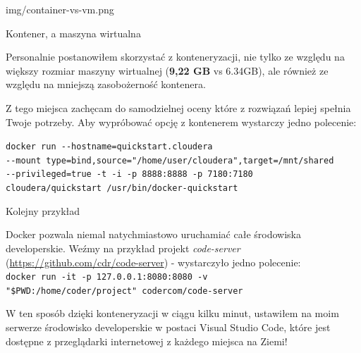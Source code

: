 \documentclass[aspectratio=169]{beamer}
\begin{document}
\begin{frameImg}[1080]{img/container-vs-vm.png}
    \vspace*{-40mm}
    \begin{cardTiny}
        Kontener, a maszyna wirtualna
    \end{cardTiny}
\end{frameImg}

\begin{frame}
    \begin{cardTiny}
        Personalnie postanowiłem skorzystać z konteneryzacji, nie tylko ze względu na większy rozmiar maszyny wirtualnej (\textbf{9,22 GB} vs 6.34GB),
        ale również ze względu na mniejszą zasobożerność kontenera.
    \end{cardTiny}
    \begin{cardTiny}
        Z tego miejsca zachęcam do samodzielnej oceny które z rozwiązań lepiej spełnia Twoje potrzeby.
        Aby wypróbować opcję z kontenerem wystarczy jedno polecenie:
    \end{cardTiny}
    \begin{cardTiny}
        \colorbox{dark-gray}{\lstinline{docker run --hostname=quickstart.cloudera}}\\
        \colorbox{dark-gray}{\lstinline{--mount type=bind,source="/home/user/cloudera",target=/mnt/shared}}\\
        \colorbox{dark-gray}{\lstinline{--privileged=true -t -i -p 8888:8888 -p 7180:7180}}\\
        \colorbox{dark-gray}{\lstinline{cloudera/quickstart /usr/bin/docker-quickstart}}
    \end{cardTiny}
\end{frame}

\begin{frame}{Kolejny przykład}
    \begin{cardTiny}
        Docker pozwala niemal natychmiastowo uruchamiać całe środowiska developerskie. 
        Weźmy na przykład projekt \textit{code-server} (\url{https://github.com/cdr/code-server}) - wystarczyło jedno polecenie:\\
        \colorbox{dark-gray}{\lstinline{docker run -it -p 127.0.0.1:8080:8080 -v}}\\
        \colorbox{dark-gray}{\lstinline{"$PWD:/home/coder/project" codercom/code-server}}
    \end{cardTiny}

    \begin{cardTiny}
        W ten sposób dzięki konteneryzacji w ciągu kilku minut, ustawiłem na moim serwerze środowisko developerskie w postaci  \colorbox{dark-gray}{Visual Studio Code}, które jest dostępne z przeglądarki internetowej z każdego miejsca na Ziemi!
    \end{cardTiny}
    
\end{frame}
\end{document}
